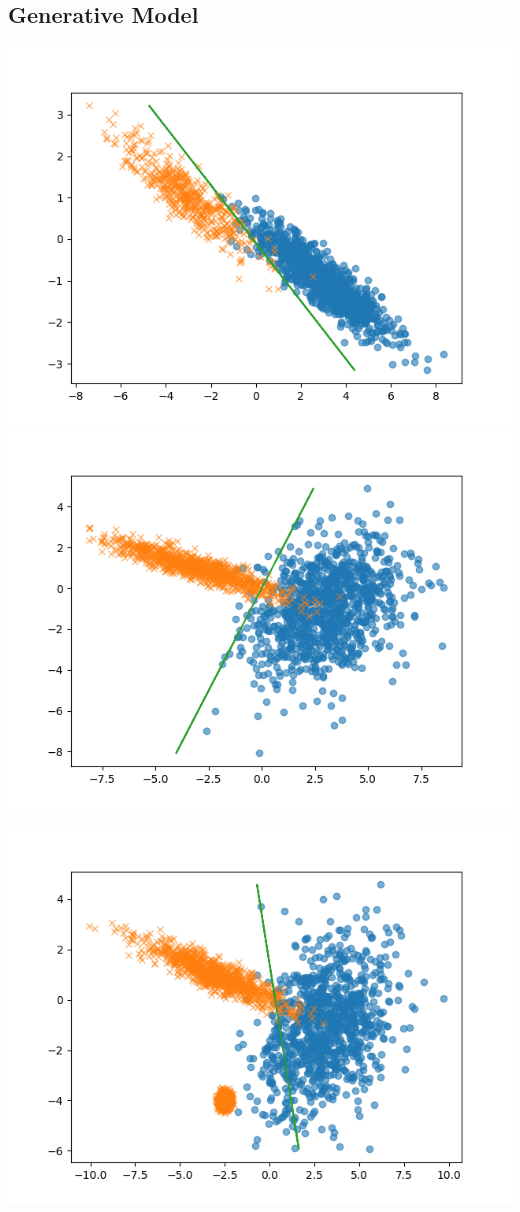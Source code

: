 \subsection{Generative Model}
\includegraphics[height= 0.3\textheight]{generativeFig0.png}
\includegraphics[height= 0.3\textheight]{generativeFig1.png}
\begin{center}
\includegraphics[height= 0.3\textheight]{generativeFig2.png}
\end{center}
